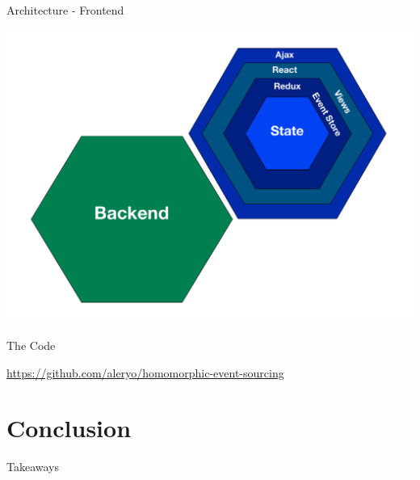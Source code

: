 \begin{frame}[fragile]{Architecture - Frontend}
  \begin{center}
    \includegraphics[height=.8\textheight]{./images/archi-front.pdf}
  \end{center}
\end{frame}

\begin{frame}[fragile]{The Code}
  \begin{center}
  \url{https://github.com/aleryo/homomorphic-event-sourcing}
  \end{center}
\end{frame}


\part{Conclusion}

\begin{frame}[fragile]{Takeaways}
\end{frame}

